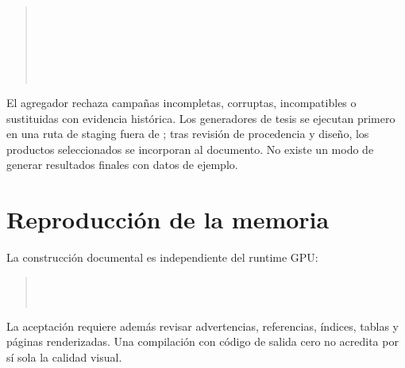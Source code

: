 \begin{quote}\small
{}\\
\hspace*{1em}\\
\hspace*{1em}\\[3pt]
\\
\hspace*{1em}\\
\hspace*{1em}
\end{quote}

El agregador rechaza campañas incompletas, corruptas, incompatibles o sustituidas con evidencia histórica. Los generadores de tesis se ejecutan primero en una ruta de staging fuera de ; tras revisión de procedencia y diseño, los productos seleccionados se incorporan al documento. No existe un modo de generar resultados finales con datos de ejemplo.

\section{Reproducción de la memoria}

La construcción documental es independiente del runtime GPU:

\begin{quote}\small
{}\\
\\
\end{quote}

La aceptación requiere además revisar advertencias, referencias, índices, tablas y páginas renderizadas. Una compilación con código de salida cero no acredita por sí sola la calidad visual.
